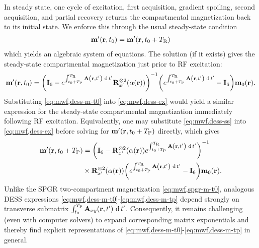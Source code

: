 In steady state,
one cycle of excitation,
first acquisition,
gradient spoiling,
second acquisition,
and partial recovery
returns the compartmental magnetization
back to its initial state.
We enforce this through 
the usual steady-state condition
\begin{align}
	\bmmp\prtz = \bmmp\paren{\bmr,t_0+\TR}
	\label{eq:mwf,dess-ss}
\end{align}
which yields an algebraic system of equations.
The solution
(if it exists)
gives the steady-state compartmental magnetization
just prior to RF excitation:
\begin{align}
	\bmmp\prtz = 
		\inv{\eye{6} - e^{\int_{t_0+\TP}^{\TR} \bmA\paren{\bmr,t'} \der{t'}} \bmRxpsix{\flip\pr}}
		\paren{e^{\int_{t_0+\TP}^{\TR} \bmA\paren{\bmr,t'} \der{t'}} - \eye{6}} \bmmzero\pr.
	\label{eq:mwf,dess-m-t0}
\end{align}
Substituting \eqref{eq:mwf,dess-m-t0} into \eqref{eq:mwf,dess-ex}
would yield a similar expression
for the steady-state compartmental magnetization
immediately following RF excitation.
Equivalently,
one may substitute \eqref{eq:mwf,dess-ss} into \eqref{eq:mwf,dess-ex}
before solving for $\bmmp\paren{\bmr,t_0+\TP}$ directly,
which gives
\begin{align}
	\bmmp\paren{\bmr,t_0+\TP} &=
		\inv{\eye{6} - \bmRxpsix{\flip\pr} e^{\int_{t_0+\TP}^{\TR} \bmA\paren{\bmr,t'} \der{t'}}}
		\nonumber \\
	&\times \bmRxpsix{\flip\pr} 
		\paren{e^{\int_{t_0+\TP}^{\TR} \bmA\paren{\bmr,t'} \der{t'}} - \eye{6}} \bmmzero\pr.
		\label{eq:mwf,dess-m-tp}
\end{align}
Unlike the SPGR two-compartment magnetization 
\eqref{eq:mwf,spgr-m-t0},
analogous DESS expressions 
\eqref{eq:mwf,dess-m-t0}-\eqref{eq:mwf,dess-m-tp} depend strongly
on transverse submatrix $\int_{t_0}^{\TP} \bmAxy\paren{\bmr,t'} \der{t'}$.
Consequently,
it remains challenging (even with computer solvers)
to expand corresponding matrix exponentials
and thereby find explicit representations 
of \eqref{eq:mwf,dess-m-t0}-\eqref{eq:mwf,dess-m-tp}
in general.

